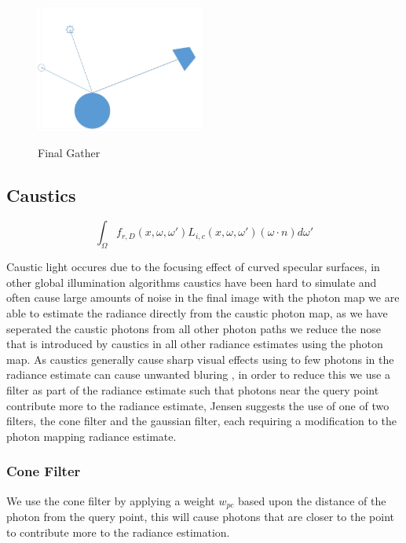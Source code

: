 \begin{figure}
\centering
\includegraphics[width=0.5\textwidth]{./images/final_gather.png}
\label{fig:final_gather}
\caption{Final Gather}
\end{figure}

\subsection{Caustics}
\begin{equation*}
		\int_{\Omega}
			f_{r,D}(x, \omega, \omega')
			L_{i,c}(x,\omega,\omega')
			(\omega \cdot n)d\omega'
\end{equation*}

Caustic light occures due to the focusing effect of curved specular surfaces, in other global illumination algorithms
caustics have been hard to simulate \cite{Jensen96a} and often cause large amounts of noise in the final image
with the photon map we are able to estimate the radiance directly from the caustic photon map, as we have seperated the
caustic photons from all other photon paths we reduce the nose that is introduced by caustics in all other radiance
estimates using the photon map. As caustics generally cause sharp visual effects using to few photons in the radiance
estimate can cause unwanted bluring \cite{JensenBook}, in order to reduce this we use a filter as part of the radiance estimate such
that photons near the query point contribute more to the radiance estimate, Jensen suggests the use of one of two filters, the
cone filter and the gaussian filter, each requiring a modification to the photon mapping radiance estimate.

\subsubsection{Cone Filter}
We use the cone filter by applying a weight $w_{pc}$ based upon the distance of the photon from the query point, this will
cause photons that are closer to the point to contribute more to the radiance estimation.

